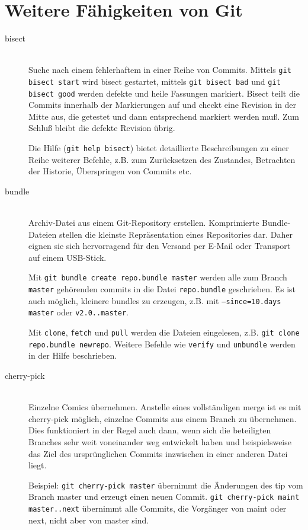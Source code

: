 \documentclass[a4paper, 12pt]{article}
\begin{document}
\section*{Weitere Fähigkeiten von Git}

\begin{description}
  \item[bisect] \hfill \\
  Suche nach einem fehlerhaftem in einer Reihe von Commits. Mittels \texttt{git bisect start} wird bisect gestartet, mittels \texttt{git bisect bad} und \texttt{git bisect good} werden defekte und heile Fassungen markiert. Bisect teilt die Commits innerhalb der Markierungen auf und checkt eine Revision in der Mitte aus, die getestet und dann entsprechend markiert werden muß. Zum Schluß bleibt die defekte Revision übrig.
    
  Die Hilfe (\texttt{git help bisect}) bietet detaillierte Beschreibungen zu einer Reihe weiterer Befehle, z.B. zum Zurücksetzen des Zustandes, Betrachten der Historie, Überspringen von Commits etc.
  \item[bundle] \hfill \\
  Archiv-Datei aus einem Git-Repository erstellen. Komprimierte Bundle-Dateien stellen die kleinste Repräsentation eines Repositories dar. Daher eignen sie sich hervorragend für den Versand per E-Mail oder Transport auf einem USB-Stick. 
  
  Mit \texttt{git bundle create repo.bundle master} werden alle zum Branch \texttt{master} gehörenden commits in die Datei \texttt{repo.bundle} geschrieben. Es ist auch möglich, kleinere bundles zu erzeugen, z.B. mit \texttt{--since=10.days master} oder \texttt{v2.0..master}.
  
  Mit \texttt{clone}, \texttt{fetch} und \texttt{pull} werden die Dateien eingelesen, z.B. \texttt{git clone repo.bundle newrepo}. Weitere Befehle wie \texttt{verify} und \texttt{unbundle} werden in der Hilfe beschrieben.

  \item[cherry-pick] \hfill \\
  Einzelne Comics übernehmen. Anstelle eines vollständigen merge ist es mit cherry-pick möglich, einzelne Commits aus einem Branch zu übernehmen. Dies funktioniert in der Regel auch dann, wenn sich die beteiligten Branches sehr weit voneinander weg entwickelt haben und beispielsweise das Ziel des ursprünglichen Commits inzwischen in einer anderen Datei liegt.
  
  Beispiel: \texttt{git cherry-pick master} übernimmt die Änderungen des tip vom Branch master und erzeugt einen neuen Commit. \texttt{git cherry-pick maint master..next} übernimmt alle Commits, die Vorgänger von maint oder next, nicht aber von master sind.
  

\end{description}
\end{document}
